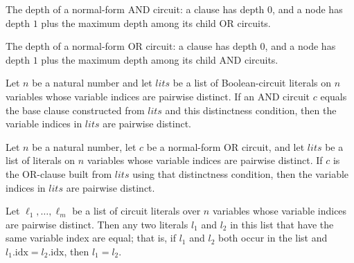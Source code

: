 \begin{definition}
\label{BoolCircuit.NAndCircuit.depth}
\leanok
{}
The depth of a normal-form AND circuit: a clause has depth $0$, and a node has depth $1$
plus the maximum depth among its child OR circuits.
\end{definition}

\begin{definition}
\label{BoolCircuit.NOrCircuit.depth}
\leanok
{}
The depth of a normal-form OR circuit: a clause has depth $0$, and a node has depth $1$
plus the maximum depth among its child AND circuits.
\end{definition}

\begin{theorem}
\label{BoolCircuit.NAndCircuit.clause_nodup}
\leanok
{}
Let $n$ be a natural number and let $lits$ be a list of Boolean-circuit literals on $n$
variables whose variable indices are pairwise distinct. If an AND circuit $c$ equals the
base clause constructed from $lits$ and this distinctness condition, then the variable
indices in $lits$ are pairwise distinct.
\end{theorem}

\begin{theorem}
\label{BoolCircuit.NOrCircuit.clause_nodup}
\leanok
{}
Let $n$ be a natural number, let $c$ be a normal-form OR circuit, and let $lits$ be a
list of literals on $n$ variables whose variable indices are pairwise distinct. If $c$
is the OR-clause built from $lits$ using that distinctness condition, then the variable
indices in $lits$ are pairwise distinct.
\end{theorem}

\begin{theorem}
\label{BoolCircuit.Lit.eq_of_idx_eq_of_mem_nodup}
\leanok
{}
Let $\ell_1,\dots,\ell_m$ be a list of circuit literals over $n$ variables whose
variable indices are pairwise distinct. Then any two literals $l_1$ and $l_2$ in this
list that have the same variable index are equal; that is, if $l_1$ and $l_2$ both occur
in the list and $l_1.\mathrm{idx} = l_2.\mathrm{idx}$, then $l_1 = l_2$.
\end{theorem}

